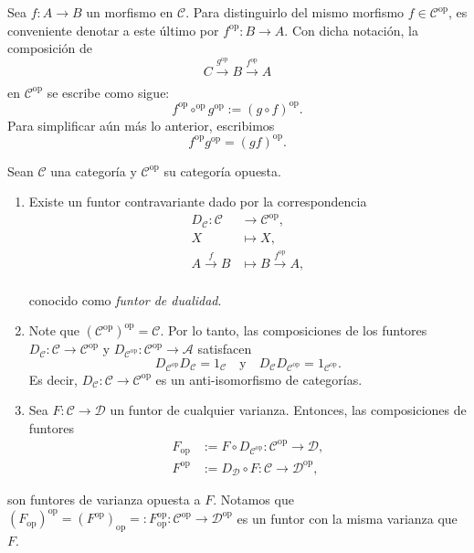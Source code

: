 \documentclass[tesis]{subfiles}
\begin{document}
\begin{Nota}
    Sea $f:A\to B$ un morfismo en $\mathscr{C}$. Para distinguirlo del mismo morfismo $f\in\mathscr{C}^\text{op}$, es conveniente denotar a este último por $f^{\text{op}}:B\to A$. Con dicha notación, la composición de
    \[
        C\xrightarrow[]{g^{\text{op}}}B\xrightarrow[]{f^{\text{op}}}A
    \] 
    en $\mathscr{C}^{\text{op}}$ se escribe como sigue:
    \[
        f^{\text{op}}\circ^{\text{op}}g^{\text{op}} := (g\circ f)^{\text{op}}.
    \] 
    Para simplificar aún más lo anterior, escribimos
    \[
        f^{\text{op}}g^{\text{op}} = (gf)^{\text{op}}.
    \] 
\end{Nota}

\begin{Obs}\label{Obs: Categoría opuesta}
    Sean $\mathscr{C}$ una categoría y $\mathscr{C}^\text{op}$ su categoría opuesta.

    \begin{enumerate}[label=(\arabic*)]
    
        \item Existe un funtor contravariante dado por la correspondencia
            \begin{align*}
                D_\mathscr{C}:\mathscr{C}&\to \mathscr{C}^\text{op}, \\
                X &\mapsto X, \\
                A\xrightarrow[]{f} B &\mapsto B\xrightarrow[]{f^\text{op}} A,
            \end{align*}
                
        conocido como \emph{funtor de dualidad}.

    \item Note que $(\mathscr{C}^{\text{op}})^{\text{op}} = \mathscr{C}$. Por lo tanto, las composiciones de los funtores $D_\mathscr{C}:\mathscr{C}\to \mathscr{C}^\text{op}$ y $D_{\mathscr{C}^\text{op}}:\mathscr{C}^\text{op}\to \mathscr{A}$ satisfacen
        \[
            D_{\mathscr{C}^\text{op}} D_\mathscr{C} = 1_\mathscr{C} \quad \text{y} \quad D_\mathscr{C} D_{\mathscr{C}^\text{op}} = 1_{\mathscr{C}^\text{op}}.
        \] 
        Es decir, $D_\mathscr{C}:\mathscr{C}\to \mathscr{C}^\text{op}$ es un anti-isomorfismo de categorías.

    \item Sea $F:\mathscr{C}\to \mathscr{D}$ un funtor de cualquier varianza. Entonces, las composiciones de funtores
        \begin{align*}
            F_\text{op}&:=F\circ D_{\mathscr{C}^\text{op}}:\mathscr{C}^\text{op}\to \mathscr{D}, \\
            F^\text{op}&:=D_\mathscr{D}\circ F:\mathscr{C}\to \mathscr{D}^\text{op},
        \end{align*}
    \end{enumerate}
    son funtores de varianza opuesta a $F$. Notamos que $(F_\text{op})^\text{op} = (F^\text{op})_\text{op} =: F_\text{op}^\text{op}:\mathscr{C}^\text{op}\to \mathscr{D}^\text{op}$ es un funtor con la misma varianza que $F$.
\end{Obs}
\end{document}
